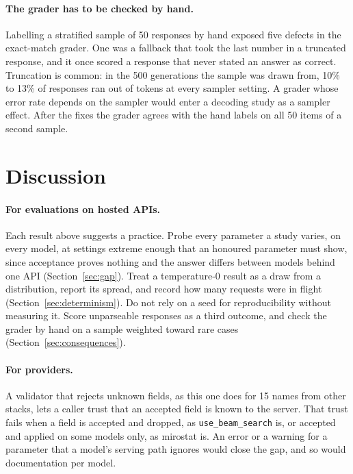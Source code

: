 \documentclass[10pt]{article}
\newcommand{\p}[1]{\texttt{#1}}
\begin{document}
\paragraph{The grader has to be checked by hand.} Labelling a stratified sample of 50 responses by hand exposed five defects in the exact-match grader. One was a fallback that took the last number in a truncated response, and it once scored a response that never stated an answer as correct. Truncation is common: in the 500 generations the sample was drawn from, 10\% to 13\% of responses ran out of tokens at every sampler setting. A grader whose error rate depends on the sampler would enter a decoding study as a sampler effect. After the fixes the grader agrees with the hand labels on all 50 items of a second sample.

\section{Discussion}

\paragraph{For evaluations on hosted APIs.} Each result above suggests a practice. Probe every parameter a study varies, on every model, at settings extreme enough that an honoured parameter must show, since acceptance proves nothing and the answer differs between models behind one API (Section~\ref{sec:gap}). Treat a temperature-0 result as a draw from a distribution, report its spread, and record how many requests were in flight (Section~\ref{sec:determinism}). Do not rely on a seed for reproducibility without measuring it. Score unparseable responses as a third outcome, and check the grader by hand on a sample weighted toward rare cases (Section~\ref{sec:consequences}).

\paragraph{For providers.} A validator that rejects unknown fields, as this one does for 15 names from other stacks, lets a caller trust that an accepted field is known to the server. That trust fails when a field is accepted and dropped, as \p{use\_beam\_search} is, or accepted and applied on some models only, as mirostat is. An error or a warning for a parameter that a model's serving path ignores would close the gap, and so would documentation per model.
\end{document}
